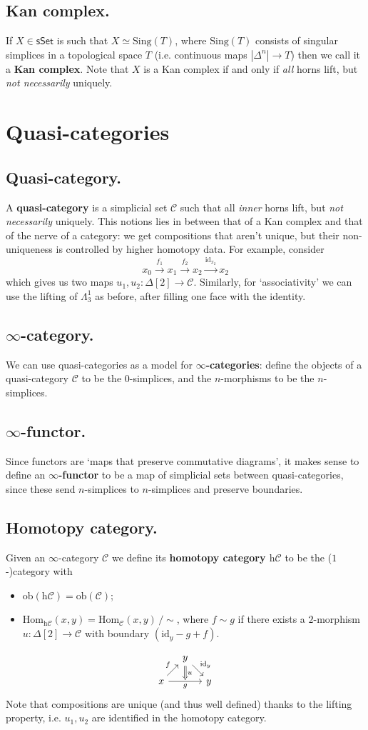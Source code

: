 \documentclass{article}
\numberwithin{equation}{subsection}
\renewcommand{\ss}[1]{\subsection{#1}}
\newcommand{\Hom}{\mathrm{Hom}}
\newcommand{\sset}{\mathsf{sSet}}
\newcommand{\C}{\mathcal{C}}
\newcommand{\id}{\mathrm{id}}
\newcommand{\h}{\mathrm{h}}
\begin{document}
        \ss{Kan complex.}
            If $X\in\sset$ is such that $X\simeq\mathrm{Sing}(T)$, where $\mathrm{Sing}(T)$ consists of singular simplices in a topological space $T$ (i.e. continuous maps $|\Delta^n|\to T$) then we call it a \textbf{Kan complex}.
            Note that $X$ is a Kan complex if and only if \emph{all} horns lift, but \emph{not necessarily} uniquely.

    \section{Quasi-categories}

        \ss{Quasi-category.}
            A \textbf{quasi-category} is a simplicial set $\C$ such that all \emph{inner} horns lift, but \emph{not necessarily} uniquely.
            This notions lies in between that of a Kan complex and that of the nerve of a category: we get compositions that aren't unique, but their non-uniqueness is controlled by higher homotopy data.
            For example, consider
            \[
                x_0\xrightarrow{f_1}x_1\xrightarrow{f_2}x_2\xrightarrow{\id_{x_2}}x_2
            \]
            which gives us two maps $u_1,u_2\colon\Delta[2]\to\C$.
            Similarly, for `associativity' we can use the lifting of $\Lambda_3^1$ as before, after filling one face with the identity.

        \ss{$\infty$-category.}
            We can use quasi-categories as a model for \textbf{$\infty$-categories}: define the objects of a quasi-category $\C$ to be the $0$-simplices, and the $n$-morphisms to be the $n$-simplices.

        \ss{$\infty$-functor.}
            Since functors are `maps that preserve commutative diagrams', it makes sense to define an \textbf{$\infty$-functor} to be a map of simplicial sets between quasi-categories, since these send $n$-simplices to $n$-simplices and preserve boundaries.

        \ss{Homotopy category.}
            Given an $\infty$-category $\C$ we define its \textbf{homotopy category $\h\C$} to be the ($1$-)category with
            \begin{itemize}
                \item $\mathrm{ob}(\h\C)=\mathrm{ob}(\C)$;
                \item $\Hom_{\h\C}(x,y)=\Hom_\C(x,y)\,/\sim$, where $f\sim g$ if there exists a $2$-morphism $u\colon\Delta[2]\to\C$ with boundary $(\id_y-g+f)$.
            \end{itemize}
            \[
                \begin{tikzcd}[row sep=1em,column sep=1em]
                    &y \ar{dr}{\id_y} \ar[Rightarrow]{d}{u}&\\
                    x \ar{ur}{f} \ar[swap]{rr}{g}&\,&y
                \end{tikzcd}
            \]
            Note that compositions are unique (and thus well defined) thanks to the lifting property, i.e. $u_1,u_2$ are identified in the homotopy category.
\end{document}
